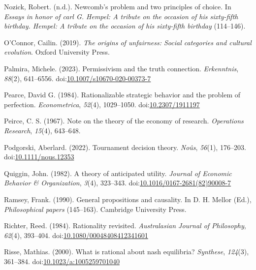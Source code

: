 \documentclass[
  12pt,
  letterpaper,
  DIV=11,
  numbers=noendperiod]{scrreprt}
\newlength{\cslhangindent}
\newenvironment{CSLReferences}[2] %
 {\begin{list}{}{%
  \setlength{\itemindent}{0pt}
  \setlength{\leftmargin}{0pt}
  \setlength{\parsep}{0pt}
  \ifodd #1
   \setlength{\leftmargin}{\cslhangindent}
   \setlength{\itemindent}{-1\cslhangindent}
  \fi
  \setlength{\itemsep}{#2\baselineskip}}}
 {\end{list}}
\begin{document}
\begin{CSLReferences}{1}{0}
Nozick, Robert. (n.d.). Newcomb's problem and two principles of choice.
In \emph{Essays in honor of carl {G}. Hempel: A tribute on the occasion
of his sixty-fifth birthday. Hempel: A tribute on the occasion of his
sixty-fifth birthday} (114--146).

O'Connor, Cailin. (2019). \emph{The origins of unfairness: Social
categories and cultural evolution}. {O}xford {U}niversity {P}ress.

Palmira, Michele. (2023). Permissivism and the truth connection.
\emph{Erkenntnis}, \emph{88}(2), 641--6556.
doi:\href{https://doi.org/10.1007/s10670-020-00373-7}{10.1007/s10670-020-00373-7}

Pearce, David G. (1984). Rationalizable strategic behavior and the
problem of perfection. \emph{Econometrica}, \emph{52}(4), 1029--1050.
doi:\href{https://doi.org/10.2307/1911197}{10.2307/1911197}

Peirce, C. S. (1967). Note on the theory of the economy of research.
\emph{Operations Research}, \emph{15}(4), 643--648.

Podgorski, Aberlard. (2022). Tournament decision theory. \emph{No{û}s},
\emph{56}(1), 176--203.
doi:\href{https://doi.org/10.1111/nous.12353}{10.1111/nous.12353}

Quiggin, John. (1982). A theory of anticipated utility. \emph{Journal of
Economic Behavior \& Organization}, \emph{3}(4), 323--343.
doi:\href{https://doi.org/10.1016/0167-2681(82)90008-7}{10.1016/0167-2681(82)90008-7}

Ramsey, Frank. (1990). General propositions and causality. In D. H.
Mellor (Ed.), \emph{Philosophical papers} (145--163). Cambridge
University Press.

Richter, Reed. (1984). Rationality revisited. \emph{Australasian Journal
of Philosophy}, \emph{62}(4), 393--404.
doi:\href{https://doi.org/10.1080/00048408412341601}{10.1080/00048408412341601}

Risse, Mathias. (2000). What is rational about nash equilibria?
\emph{Synthese}, \emph{124}(3), 361--384.
doi:\href{https://doi.org/10.1023/a:1005259701040}{10.1023/a:1005259701040}


\end{CSLReferences}
\end{document}
